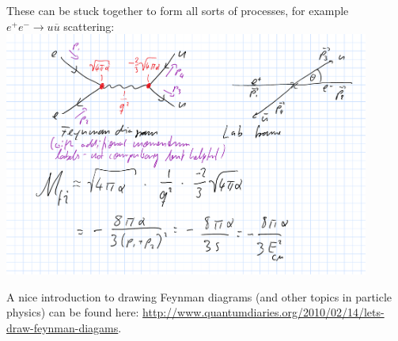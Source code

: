 These can be stuck together to form all sorts of processes, for example $e^+ e^- \to u \overline{u}$ scattering:
\\
\includegraphics[width=0.9\textwidth]{fig/ExampleQED_1}


A nice introduction to drawing Feynman diagrams (and other topics in particle physics) can be found here: \href{http://www.quantumdiaries.org/2010/02/14/lets-draw-feynman-diagams}{http://www.quantumdiaries.org/2010/02/14/lets-draw-feynman-diagams}.